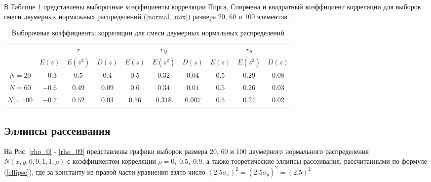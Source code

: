 \documentclass[12pt]{article}
\begin{document}
\begin{flushleft}
        В Таблице \ref{table_mix_normal} представлены выборочные коэффициенты корреляции Пирса, Спирмена и квадратный коэффициент корреляции для выборок смеси двумерных нормальных распределений (\ref{normal_mix}) размера 20, 60 и 100 элементов.

        \begin{table}[h]
            \begin{center}
                \caption{Выборочные коэффициенты корреляции для смеси двумерных нормальных распределений}
                \begin{tabular}{||c||*{3}{c|}|*{3}{c|}|*{3}{c|}|} \hhline{~|t:===:t:===:t:===:t|}
                \multicolumn{1}{c||}{} & \multicolumn{3}{c||}{$r$} & \multicolumn{3}{c||}{$r_Q$} & \multicolumn{3}{c||}{$r_S$}\\ 
                \hhline{~||---||---||---||}
                \multicolumn{1}{c||}{} & $E(z)$ & $E(z^2)$ & $D(z)$ & $E(z)$ & $E(z^2)$ & $D(z)$ & $E(z)$ & $E(z^2)$ & $D(z)$\\ 
                \hhline{|t:=::===::===::===:|}

                $N = 20$ & $-0.3$ & $0.5$ & $0.4$ & $0.5$ & $0.32$ & $0.04$ & $0.5$ & $0.29$ & $0.08$\\
                \hhline{||-||---||---||---||}
                $N = 60$ & $-0.6$ & $0.49$ & $0.09$ & $0.6$ & $0.34$ & $0.01$ & $0.5$ & $0.26$ & $0.03$\\
                \hhline{||-||---||---||---||}
                $N = 100$ & $-0.7$ & $0.52$ & $0.03$ & $0.56$ & $0.318$ & $0.007$ & $0.5$ & $0.24$ & $0.02$\\
                \hhline{|b:=:b:===:b:===:b:===:b|}
                \end{tabular}
            \label{table_mix_normal}
            \end{center}
        \end{table}

    \subsection{Эллипсы рассеивания}

    На Рис. \ref{rho_0} - \ref{rho_09} представлены графики выборок размера 20, 60 и 100 двумерного нормального распределения $N(x, y, 0, 0, 1, 1, \rho)$ с коэффициентом корреляции $\rho = 0, \; 0.5, \; 0.9$, а также теоретические эллипсы рассеивания, рассчитанными по формуле (\ref{ellipse}), где за константу из правой части уравнения взято число $(2.5\sigma_x)^2 = (2.5\sigma_y)^2 = (2.5)^2$


\end{flushleft}
\end{document}
